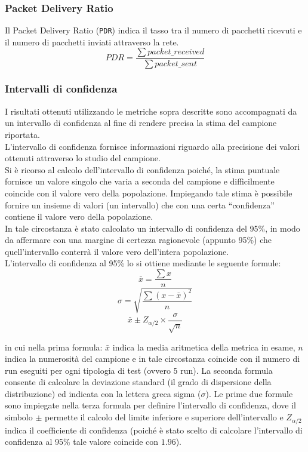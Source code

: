 \subsubsection{Packet Delivery Ratio}
Il Packet Delivery Ratio (\texttt{PDR}) indica il tasso tra il numero di pacchetti ricevuti e il numero di pacchetti inviati attraverso la rete. 
$$ PDR = \frac{\sum packet\_received}{\sum packet\_sent} $$

\subsubsection{Intervalli di confidenza}
I risultati ottenuti utilizzando le metriche sopra descritte sono accompagnati da un intervallo di confidenza al fine di rendere precisa la stima del campione riportata.\\
L'intervallo di confidenza fornisce informazioni riguardo alla precisione dei valori ottenuti attraverso lo studio del campione. \\
Si è ricorso al calcolo dell'intervallo di confidenza poiché, la stima puntuale fornisce un valore singolo che varia a seconda del campione e difficilmente coincide con il valore vero della popolazione. Impiegando tale stima è possibile fornire un insieme di valori (un intervallo) che con una certa ``confidenza'' contiene il valore vero della popolazione.\\
In tale circostanza è stato calcolato un intervallo di confidenza del 95\%, in modo da affermare con una margine di certezza ragionevole (appunto 95\%) che quell'intervallo conterrà il valore vero dell'intera popolazione.\\

\noindent L'intervallo di confidenza al 95\% lo si ottiene mediante le seguente formule:
$$\bar{x} = \frac{\sum x}{n}$$
$$\sigma = \sqrt{\frac{\sum (x-\bar{x})^2}{n}}$$
$$\bar{x} \pm Z_{\alpha/2} \times \frac{\sigma}{\sqrt{n}}$$

\noindent in cui nella prima formula: $\bar{x}$ indica la media aritmetica della metrica in esame, $n$ indica la numerosità del campione e in tale circostanza coincide con il numero di run eseguiti per ogni tipologia di test (ovvero 5 run). La seconda formula consente di calcolare la deviazione standard (il grado di dispersione della distribuzione) ed indicata con la lettera greca sigma ($\sigma$). Le prime due formule sono impiegate nella terza formula per definire l'intervallo di confidenza, dove il simbolo $\pm$ permette il calcolo del limite inferiore e superiore dell'intervallo e $Z_{\alpha/2}$ indica il coefficiente di confidenza (poiché è stato scelto di calcolare l'intervallo di confidenza al 95\% tale valore coincide con $1.96$).

